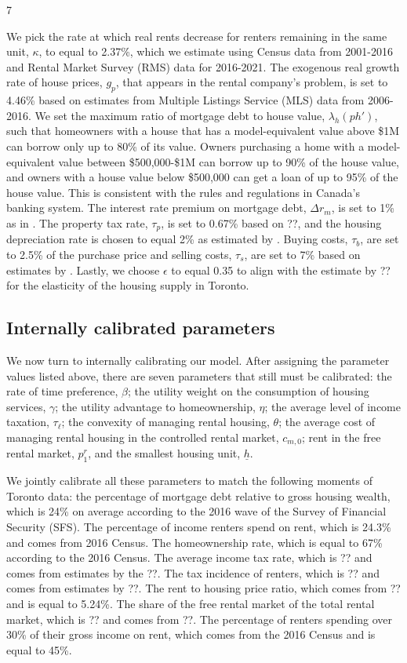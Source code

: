 7\documentclass[parskip=full]{article}
\begin{document}
We pick the rate at which real rents decrease for renters remaining in the same unit, $\kappa$, to equal to 2.37\%, which we estimate using Census data from 2001-2016 and Rental Market Survey (RMS) data for 2016-2021. The exogenous real growth rate of house prices, $g_{p}$, that appears in the rental company's problem, is set to 4.46\% based on estimates from Multiple Listings Service (MLS) data from 2006-2016. We set the maximum ratio of mortgage debt to house value, $\lambda_{h}(ph')$, such that homeowners with a house that has a model-equivalent value above \$1M can borrow only up to 80\% of its value. Owners purchasing a home with a model-equivalent value between \$500,000-\$1M can borrow up to 90\% of the house value, and owners with a house value below \$500,000 can get a loan of up to 95\% of the house value. This is consistent with the rules and regulations in Canada's banking system. The interest rate premium on mortgage debt, $\Delta r_{m}$, is set to 1\% as in \citet{kaplanetal-2019}. The property tax rate, $\tau_p$, is set to 0.67\% based on ??, and the housing depreciation rate is chosen to equal 2\% as estimated by \citet{hardingetal-2007}. Buying costs, $\tau_{b}$, are set to 2.5\% of the purchase price and selling costs, $\tau_{s}$, are set to 7\% based on estimates by \citet{gm-2003}. Lastly, we choose $\epsilon$ to equal 0.35 to align with the estimate by ?? for the elasticity of the housing supply in Toronto.

\subsection{Internally calibrated parameters}

We now turn to internally calibrating our model. After assigning the parameter values listed above, there are seven parameters that still must be calibrated: the rate of time preference, $\beta$; the utility weight on the consumption of housing services, $\gamma$; the utility advantage to homeownership, $\eta$; the average level of income taxation, $\tau_{\ell}$; the convexity of managing rental housing, $\theta$; the average cost of managing rental housing in the controlled rental market, $c_{m,0}$; rent in the free rental market, $p^{r}_{1}$, and the smallest housing unit, $\underline{h}$.

We jointly calibrate all these parameters to match the following moments of Toronto data: the percentage of mortgage debt relative to gross housing wealth, which is 24\% on average according to the 2016 wave of the Survey of Financial  Security (SFS). The percentage of income renters spend on rent, which is 24.3\% and comes from 2016 Census. The homeownership rate, which is equal to 67\% according to the 2016 Census. The average income tax rate, which is ?? and comes from estimates by the ??. The tax incidence of renters, which is ?? and comes from estimates by ??. The rent to housing price ratio, which comes from ?? and is equal to 5.24\%. The share of the free rental market of the total rental market, which is ?? and comes from ??. The percentage of renters spending over 30\% of their gross income on rent, which comes from the 2016 Census and is equal to 45\%.
\end{document}
